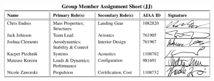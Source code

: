 \documentclass[conf]{new-aiaa}
\begin{document}


\newpage

\begin{figure}[!h]
    \centering
    \includegraphics[width=\linewidth]{Photos/signatures.JPG}
    \label{fig:my_label}
\end{figure}


\newpage
\tableofcontents
\end{document}
